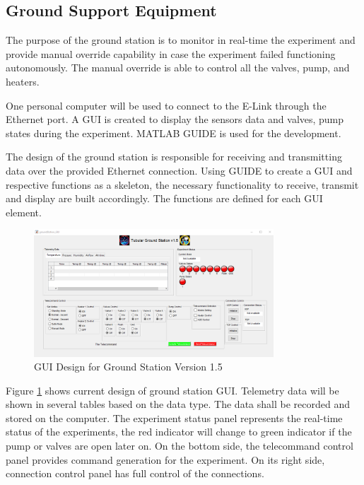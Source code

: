 \pagebreak
\subsection{Ground Support Equipment}\label{sec:4.9}
The purpose of the ground station is to monitor in real-time the experiment and provide manual override capability in case the experiment failed functioning autonomously. The manual override is able to control all the valves, pump, and heaters. \par
One personal computer will be used to connect to the E-Link through the Ethernet port. A GUI is created to display the sensors data and valves, pump states during the experiment. MATLAB GUIDE is used for the development. \par
The design of the ground station is responsible for receiving and transmitting data over the provided Ethernet connection. Using GUIDE to create a GUI and respective functions as a skeleton, the necessary  functionality to receive, transmit and display are built accordingly. The functions are defined for each GUI element.
\begin{figure}[H]
    \centering
    \includegraphics[width=0.8\textwidth]{4-experiment-design/img/GS-GUI2.png}
    \caption{GUI Design for Ground Station Version 1.5}
    \label{fig:guiDesign}
\end{figure}
Figure \ref{fig:guiDesign} shows current design of ground station GUI. Telemetry data will be shown in several tables based on the data type. The data shall be recorded and stored on the computer. The experiment status panel represents the real-time status of the experiments, the red indicator will change to green indicator if the pump or valves are open later on. On the bottom side, the telecommand control panel provides command generation for the experiment. On its right side, connection control panel has full control of the connections.


\raggedbottom